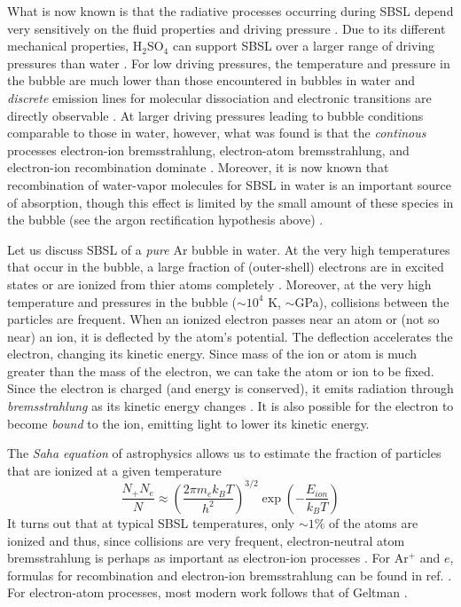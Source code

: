 \documentclass[prb,aps,nofootinbib,superscriptaddress,floatfix]{revtex4-2}
\begin{document}
What is now known is that the radiative processes occurring during SBSL depend very sensitively on the fluid properties and driving pressure \cite{flannigan2006measurement,flannigan2005plasma}. Due to its different mechanical properties, H$_2$SO$_4$ can support SBSL over a larger range of driving pressures than water \cite{an2009diagnosing}. For low driving pressures, the temperature and pressure in the bubble are much lower than those encountered in bubbles in water and \emph{discrete} emission lines for molecular dissociation and electronic transitions are directly observable \cite{flannigan2005plasma,flannigan2006measurement}. At larger driving pressures leading to bubble conditions comparable to those in water, however, what was found is that the \emph{continous} processes electron-ion bremsstrahlung, electron-atom bremsstrahlung, and electron-ion recombination dominate \cite{hilgenfeldt1999simple,yasui2018acoustic,suslick2008inside,zel2002physics}. Moreover, it is now known that recombination of water-vapor molecules for SBSL in water is an important source of absorption, though this effect is limited by the small amount of these species in the bubble (see the argon rectification hypothesis above) \cite{an2006mechanism}. 

Let us discuss SBSL of a \emph{pure} Ar bubble in water. At the very high temperatures that occur in the bubble, a large fraction of (outer-shell) electrons are in excited states or are ionized from thier atoms completely \cite{zel2002physics}. Moreover, at the very high temperature and pressures in the bubble ($\sim 10^4$ K, $\sim$GPa), collisions between the particles are frequent. When an ionized electron passes near an atom or (not so near) an ion, it is deflected by the atom's potential. The deflection accelerates the electron, changing its kinetic energy. Since mass of the ion or atom is much greater than the mass of the electron, we can take the atom or ion to be fixed. Since the electron is charged (and energy is conserved), it emits radiation through \emph{bremsstrahlung} as its kinetic energy changes \cite{jackson1999classical,zel2002physics}. It is also possible for the electron to become \emph{bound} to the ion, emitting light to lower its kinetic energy.

The \emph{Saha equation} of astrophysics allows us to estimate the fraction of particles that are ionized at a given temperature \cite{hilgenfeldt1999simple,an2006mechanism,zel2002physics}
\begin{equation}
    \frac{N_+ N_e}{N} \approx \left( \frac{2 \pi m_e k_B T}{h^2} \right)^{3/2} \exp \left(-\frac{E_{ion}}{ k_B T} \right)
    \label{eq:saha}
\end{equation}
It turns out that at typical SBSL temperatures, only $\sim 1\%$ of the atoms are ionized and thus, since collisions are very frequent, electron-neutral atom bremsstrahlung is perhaps as important as electron-ion processes \cite{hilgenfeldt1999simple,an2006mechanism,flannigan2005plasma}. For Ar$^+$ and $e$, formulas for recombination and electron-ion bremsstrahlung can be found in ref. \cite{hilgenfeldt1999simple}. For electron-atom processes, most modern work follows that of Geltman \cite{geltman1973free,an2006mechanism,an2008spectral}.
\end{document}
